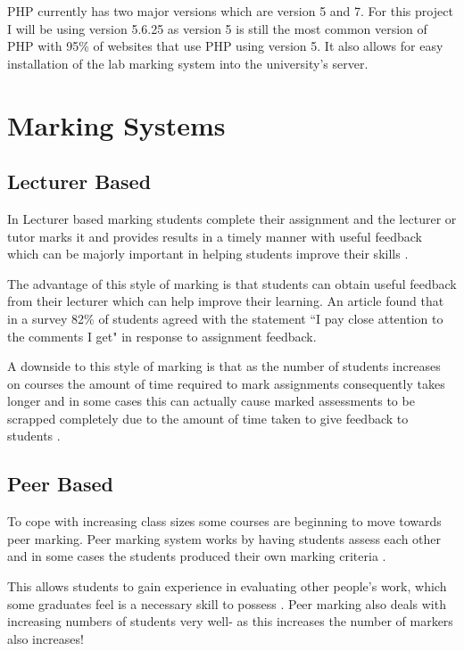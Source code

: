 \documentclass[11pt]{report}
\begin{document}
PHP currently has two major versions which are version 5 and 7. For this project I will be using version 5.6.25 as version 5 is still the most common version of PHP \cite{_usage_????} with 95\% of websites that use PHP using version 5. It also allows for easy installation of the lab marking system into the university's server.



\section{Marking Systems}

\subsection{Lecturer Based}
In Lecturer based marking  students complete their assignment and the lecturer or tutor marks it and provides results in a timely manner with useful feedback which can be majorly important in helping students improve their skills  \cite{tang_investigating_2011-5}.

The advantage of this style of marking is that students can obtain useful feedback from their lecturer which can help improve their learning.  An article \cite{higgins_conscientious_2002-1} found that in a survey 82\% of students agreed with the statement ``I pay close attention to the comments I get" in response to assignment feedback.

A downside to this style of marking is that as the number of students increases on courses the amount of time required to mark assignments consequently takes longer and in some cases this can actually cause marked assessments to be scrapped completely due to the amount of time taken to give feedback to students \cite{brown_assessment_1999-8}.


\subsection{Peer Based}
To cope with increasing class sizes some courses are beginning to move towards peer marking. Peer marking system works by having students assess each other and in some cases  the students produced their own marking criteria \cite{orsmond_use_2000-1}.

This allows students to gain experience in evaluating other people's work, which some graduates feel is a necessary skill to possess \cite{langan_insights_????-1}. Peer marking also deals with increasing numbers of students very well- as this increases the number of markers also increases!
\end{document}
